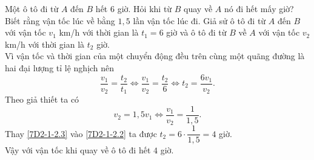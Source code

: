 
\begin{bt}%
 Một ô tô đi từ $A$ đến $B$ hết $6$ giờ. Hỏi khi từ $B$ quay về $A$ nó đi hết mấy giờ? Biết rằng vận tốc lúc về bằng $1{,}5$ lần vận tốc lúc đi.
 \loigiai
  {
  Giả sử ô tô đi từ $A$ đến $B$ với vận tốc $v_1$ km/h với thời gian là $t_1=6$ giờ và ô tô đi từ $B$ về $A$ với vận tốc $v_2$ km/h với thời gian là $t_2$ giờ.\\
  Vì vận tốc và thời gian của một chuyển động đều trên cùng một quãng đường là hai đại lượng tỉ lệ nghịch nên
  \begin{equation}\label{7D2-1-2.2}
  \dfrac{v_1}{v_2} = \dfrac{t_2}{t_1} \Leftrightarrow \dfrac{v_1}{v_2} = \dfrac{t_2}{6} \Leftrightarrow t_2 = \dfrac{6v_1}{v_2}.
  \end{equation}
  Theo giả thiết ta có
  \begin{equation}\label{7D2-1-2.3}
   v_2=1{,}5v_1 \Leftrightarrow \dfrac{v_1}{v_2} = \dfrac{1}{1{,}5}.
  \end{equation}
  Thay \eqref{7D2-1-2.3} vào \eqref{7D2-1-2.2} ta được $t_2=6\cdot\dfrac{1}{1{,}5} = 4$ giờ.\\
  Vậy với vận tốc khi quay về ô tô đi hết $4$ giờ.
  }
\end{bt}

